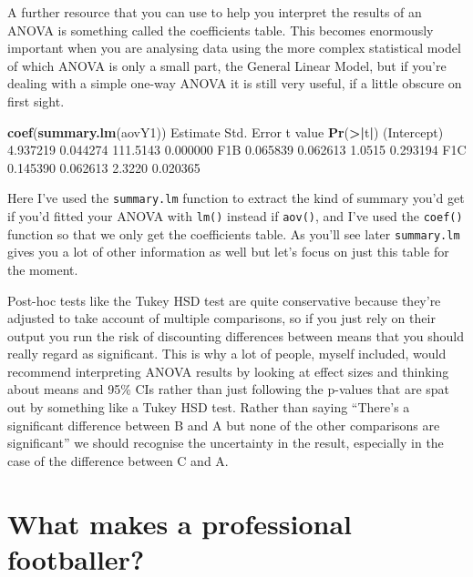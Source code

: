 \documentclass[
]{book}
\newenvironment{Shaded}{\begin{snugshade}}{\end{snugshade}}
\newcommand{\ErrorTok}[1]{\textcolor[rgb]{0.64,0.00,0.00}{\textbf{#1}}}
\newcommand{\FloatTok}[1]{\textcolor[rgb]{0.00,0.00,0.81}{#1}}
\newcommand{\KeywordTok}[1]{\textcolor[rgb]{0.13,0.29,0.53}{\textbf{#1}}}
\newcommand{\NormalTok}[1]{#1}
\newcommand{\OperatorTok}[1]{\textcolor[rgb]{0.81,0.36,0.00}{\textbf{#1}}}
\begin{document}
A further resource that you can use to help you interpret the results of an ANOVA is something called the coefficients table. This becomes enormously important when you are analysing data using the more complex statistical model of which ANOVA is only a small part, the General Linear Model, but if you're dealing with a simple one-way ANOVA it is still very useful, if a little obscure on first sight.

\begin{Shaded}
\begin{Highlighting}[]
\KeywordTok{coef}\NormalTok{(}\KeywordTok{summary.lm}\NormalTok{(aovY1))}
\NormalTok{            Estimate Std. Error  t value }\KeywordTok{Pr}\NormalTok{(}\OperatorTok{>}\ErrorTok{|}\NormalTok{t}\OperatorTok{|}\NormalTok{)}
\NormalTok{(Intercept) }\FloatTok{4.937219}   \FloatTok{0.044274} \FloatTok{111.5143} \FloatTok{0.000000}
\NormalTok{F1B         }\FloatTok{0.065839}   \FloatTok{0.062613}   \FloatTok{1.0515} \FloatTok{0.293194}
\NormalTok{F1C         }\FloatTok{0.145390}   \FloatTok{0.062613}   \FloatTok{2.3220} \FloatTok{0.020365}
\end{Highlighting}
\end{Shaded}

Here I've used the \texttt{summary.lm} function to extract the kind of summary you'd get if you'd fitted your ANOVA with \texttt{lm()} instead if \texttt{aov()}, and I've used the \texttt{coef()} function so that we only get the coefficients table. As you'll see later \texttt{summary.lm} gives you a lot of other information as well but let's focus on just this table for the moment.

Post-hoc tests like the Tukey HSD test are quite conservative because they're adjusted to take account of multiple comparisons, so if you just rely on their output you run the risk of discounting differences between means that you should really regard as significant. This is why a lot of people, myself included, would recommend interpreting ANOVA results by looking at effect sizes and thinking about means and 95\% CIs rather than just following the p-values that are spat out by something like a Tukey HSD test. Rather than saying ``There's a significant difference between B and A but none of the other comparisons are significant'' we should recognise the uncertainty in the result, especially in the case of the difference between C and A.

\hypertarget{what-makes-a-professional-footballer}{%
\section{What makes a professional footballer?}\label{what-makes-a-professional-footballer}}
\end{document}
